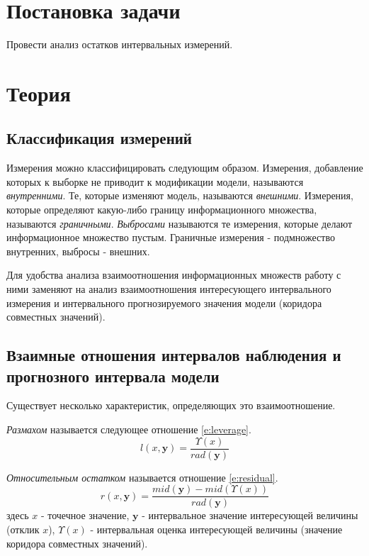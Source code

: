 \documentclass[a4paper,12pt]{article}
\begin{document}
    
    \newpage

    \tableofcontents
    \listoffigures
    \newpage

    \section{Постановка задачи}
    \quad Провести анализ остатков интервальных измерений.
    
    \section{Теория}
    \subsection{Классификация измерений}
    \quad Измерения можно классифицировать следующим образом.
    Измерения, добавление которых к выборке не приводит к модификации модели, называются \textsl{внутренними}.
    Те, которые изменяют модель, называются \textsl{внешними}.
    Измерения, которые определяют какую-либо границу информационного множества, называются \textsl{граничными}.
    \textsl{Выбросами} называются те измерения, которые делают информационное множество пустым.
    Граничные измерения - подмножество внутренних, выбросы - внешних.

    Для удобства анализа взаимоотношения информационных множеств работу с ними заменяют
    на анализ взаимоотношения интересующего интервального измерения и интервального прогнозируемого
    значения модели (коридора совместных значений).

    \subsection{Взаимные отношения интервалов наблюдения и прогнозного интервала модели}
    \quad Существует несколько характеристик, определяющих это взаимоотношение.

    \textsl{Размахом} называется следующее отношение \ref{e:leverage}.
    \begin{equation}
        l(x, \textbf{y}) = \frac{\Upsilon(x)}{rad(\textbf{y})}
        \label{e:leverage}
    \end{equation}

    \textsl{Относительным остатком} называется отношение \ref{e:residual}.
    \begin{equation}
        r(x, \textbf{y}) = \frac{mid(\textbf{y}) - mid(\Upsilon(x))}{rad(\textbf{y})}
        \label{e:residual}
    \end{equation}
    здесь $ x $ - точечное значение, $ \textbf{y} $ - интервальное значение интересующей величины (отклик $ x $),
    $ \Upsilon(x) $ - интервальная оценка интересующей величины (значение коридора совместных значений).
\end{document}
